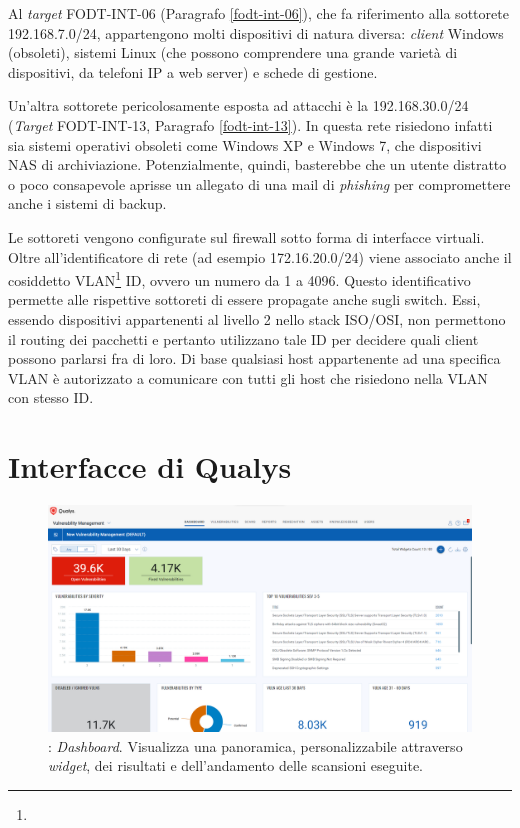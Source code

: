 \documentclass[target=bach,aauheader=]{thud}
\begin{document}
Al \textit{target} FODT-INT-06 (Paragrafo \ref{fodt-int-06}), che fa riferimento alla sottorete 192.168.7.0/24, appartengono molti dispositivi di natura diversa: \textit{client} Windows (obsoleti), sistemi Linux (che possono comprendere una grande varietà di dispositivi, da telefoni IP a web server) e schede di gestione.

Un'altra sottorete pericolosamente esposta ad attacchi è la 192.168.30.0/24 (\textit{Target} FODT-INT-13, Paragrafo \ref{fodt-int-13}). In questa rete risiedono infatti sia sistemi operativi obsoleti come Windows XP e Windows 7, che dispositivi NAS di archiviazione. Potenzialmente, quindi, basterebbe che un utente distratto o poco consapevole aprisse un allegato di una mail di \textit{phishing} per compromettere anche i sistemi di backup.

Le sottoreti vengono configurate sul firewall sotto forma di interfacce virtuali. Oltre all'identificatore di rete (ad esempio 172.16.20.0/24) viene associato anche il cosiddetto VLAN\footnote{} ID, ovvero un numero da 1 a 4096. Questo identificativo permette alle rispettive sottoreti di essere propagate anche sugli switch. Essi, essendo dispositivi appartenenti al livello 2 nello stack ISO/OSI, non permettono il routing dei pacchetti e pertanto utilizzano tale ID per decidere quali client possono parlarsi fra di loro. Di base qualsiasi host appartenente ad una specifica VLAN è autorizzato a comunicare con tutti gli host che risiedono nella VLAN con stesso ID. 

\appendix


\chapter{Interfacce di Qualys}
\label{appendix:a}

\begin{figure}[h]
\centering
    \includegraphics[scale=0.329]{images/qualys_dashboard.png}
    \caption{: \textit{Dashboard}. Visualizza una panoramica, personalizzabile attraverso \textit{widget}, dei risultati e dell'andamento delle scansioni eseguite.}
\end{figure}
\end{document}

